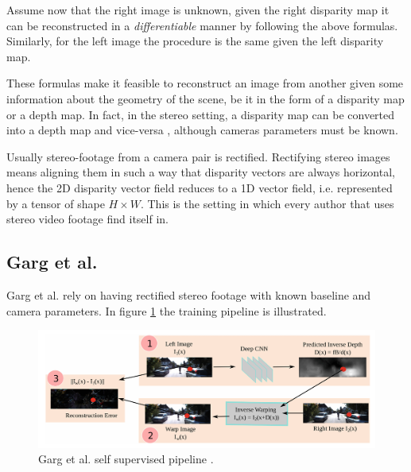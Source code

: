 Assume now that the right image is unknown, given the right disparity map it can be reconstructed in a \textit{differentiable} manner by following the above formulas.
Similarly, for the left image the procedure is the same given the left disparity map.

These formulas make it feasible to reconstruct an image from another given some information about the geometry of the scene, be it in the form of a disparity map or a depth map.
In fact, in the stereo setting, a disparity map can be converted into a depth map and vice-versa \cite{multiview}, although cameras parameters must be known.

Usually stereo-footage from a camera pair is rectified.
Rectifying stereo images means aligning them in such a way that disparity vectors are always horizontal, hence the 2D disparity vector field reduces to a 1D vector field, i.e. represented by a tensor of shape $H \times W$.
This is the setting in which every author that uses stereo video footage find itself in.

\subsection{Garg et al.}
Garg et al. \cite{Garg} rely on having rectified stereo footage with known baseline and camera parameters.
In figure \ref{fig:garg} the training pipeline is illustrated.

\begin{figure}
	\centering
	\includegraphics[scale=0.3]{figs/garg}
	\caption{Garg et al. self supervised pipeline \cite{Garg}. \label{fig:garg}}
\end{figure}

